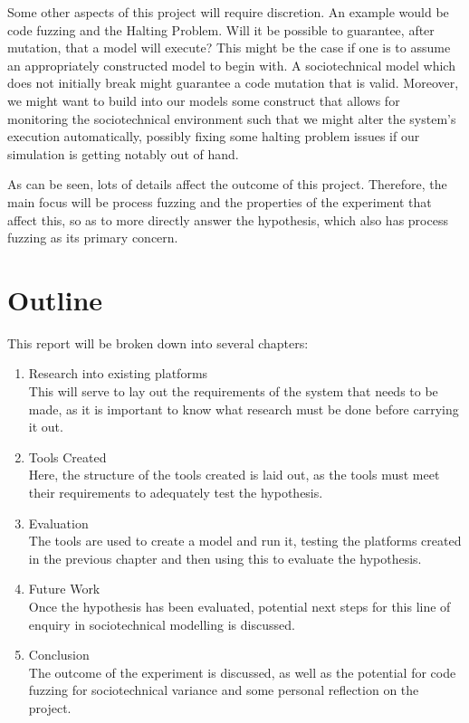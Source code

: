 Some other aspects of this project will require discretion. An example would be code fuzzing and the Halting Problem. Will it be possible to guarantee, after mutation, that a model will execute? This might be the case if one is to assume an appropriately constructed model to begin with. A sociotechnical model which does not initially break might guarantee a code mutation that is valid. Moreover, we might want to build into our models some construct that allows for monitoring the sociotechnical environment such that we might alter the system's execution automatically, possibly fixing some halting problem issues if our simulation is getting notably out of hand. \par%

As can be seen, lots of details affect the outcome of this project. Therefore, the main focus will be process fuzzing and the properties of the experiment that affect this, so as to more directly answer the hypothesis, which also has process fuzzing as its primary concern. \par%


\section{Outline}
\label{outline}
This report will be broken down into several chapters: 
\begin{enumerate}[start=3]
    \item Research into existing platforms\hfill \\
        This will serve to lay out the requirements of the system that needs to be made, as it is important to know what research must be done before carrying it out. 
    \item Tools Created\hfill \\
        Here, the structure of the tools created is laid out, as the tools must meet their requirements to adequately test the hypothesis.
    \item Evaluation\hfill \\
        The tools are used to create a model and run it, testing the platforms created in the previous chapter and then using this to evaluate the hypothesis.
    \item Future Work\hfill \\
        Once the hypothesis has been evaluated, potential next steps for this line of enquiry in sociotechnical modelling is discussed.
    \item Conclusion\hfill \\
        The outcome of the experiment is discussed, as well as the potential for code fuzzing for sociotechnical variance and some personal reflection on the project.
\end{enumerate}